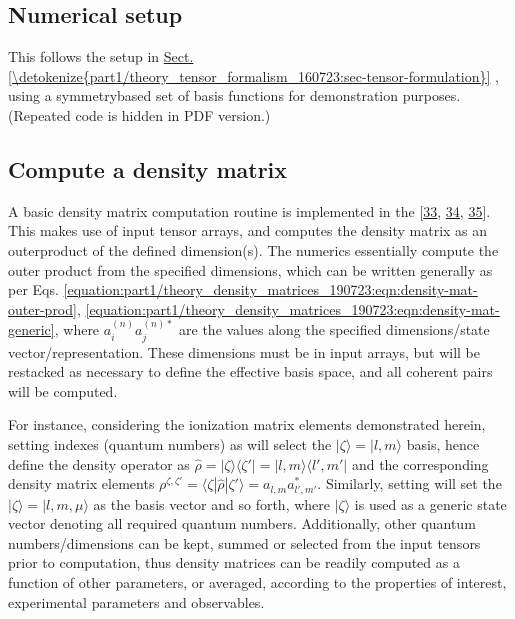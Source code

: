 \documentclass[letterpaper,table,10pt,english]{jupyterBook}
\begin{document}
\subsection{Numerical setup}
\label{\detokenize{part1/theory_density_matrices_190723:numerical-setup}}
\sphinxAtStartPar
This follows the setup in \hyperref[\detokenize{part1/theory_tensor_formalism_160723:sec-tensor-formulation}]{Sect.\@ \ref{\detokenize{part1/theory_tensor_formalism_160723:sec-tensor-formulation}}} {\hyperref[\detokenize{part1/theory_tensor_formalism_160723:sec-tensor-formulation}]{}}, using a symmetry\sphinxhyphen{}based set of basis functions for demonstration purposes. (Repeated code is hidden in PDF version.)


\subsection{Compute a density matrix}
\label{\detokenize{part1/theory_density_matrices_190723:compute-a-density-matrix}}
\sphinxAtStartPar
A basic density matrix computation routine is implemented in the  {[}\hyperlink{cite.backmatter/bibliography:id666}{33}, \hyperlink{cite.backmatter/bibliography:id608}{34}, \hyperlink{cite.backmatter/bibliography:id606}{35}{]}. This makes use of input tensor arrays, and computes the density matrix as an outer\sphinxhyphen{}product of the defined dimension(s). The numerics essentially compute the outer product from the specified dimensions, which can be written generally as per Eqs. \eqref{equation:part1/theory_density_matrices_190723:eqn:density-mat-outer-prod}, \eqref{equation:part1/theory_density_matrices_190723:eqn:density-mat-generic}, where \(a_{i}^{(n)}a_{j}^{(n)*}\) are the values along the specified dimensions/state vector/representation. These dimensions must be in input arrays, but will be restacked as necessary to define the effective basis space, and all coherent pairs will be computed.

\sphinxAtStartPar
For instance, considering the ionization matrix elements demonstrated herein, setting indexes (quantum numbers) as \sphinxcode{\sphinxupquote{{[}l,m{]}}} will select the \(|\zeta\rangle = |l,m\rangle\) basis, hence define the density operator as \(\hat{\rho} = |\zeta\rangle \langle\zeta'| = |l,m\rangle\langle l',m'|\) and the corresponding density matrix elements \(\rho^{\zeta,\zeta'}=\langle\zeta|\hat{\rho}|\zeta'\rangle=a_{l,m}a_{l',m'}^{*}\). Similarly, setting \sphinxcode{\sphinxupquote{{[}'l','m','mu'{]}}} will set the \(|\zeta\rangle = |l,m,\mu\rangle\) as the basis vector and so forth, where \(|\zeta\rangle\) is used as a generic state vector denoting all required quantum numbers. Additionally, other quantum numbers/dimensions can be kept, summed or selected from the input tensors prior to computation, thus density matrices can be readily computed as a function of other parameters, or averaged, according to the properties of interest, experimental parameters and observables.
\end{document}
